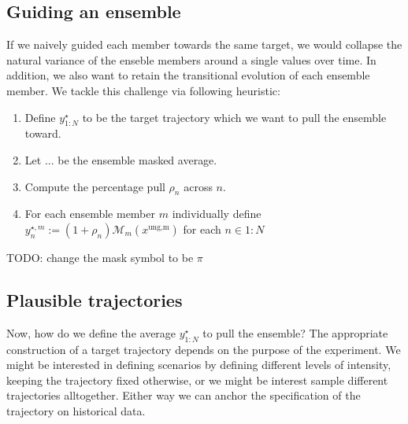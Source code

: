 \subsection{Guiding an ensemble}
If we naively guided each member towards the same target, we would collapse the natural variance of the enseble members around a single values over time.
In addition, we also want to retain the transitional evolution of each ensemble member. 
We tackle this challenge via following heuristic:
\begin{enumerate}[noitemsep]
    \item Define $y^\star_{1:N}$ to be the target trajectory which we want to pull the ensemble toward.
    \item Let $...$ be the ensemble masked average.
    \item Compute the percentage pull $\rho_n$ across $n$.
    \item For each ensemble member $m$ individually define $y^{\star, m}_{n}:= (1+\rho_n)\mathcal{M}_m(x^\text{ung,m})$ for each $n \in 1:N$ 
\end{enumerate}

TODO: change the mask symbol to be $\pi$ 

\subsection{Plausible trajectories}

Now, how do we define the average $y^\star_{1:N}$ to pull the ensemble?
The appropriate construction of a target trajectory depends on the purpose of the experiment.
We might be interested in defining scenarios by defining different levels of intensity, keeping the trajectory fixed otherwise, 
or we might be interest sample different trajectories alltogether.
Either way we can anchor the specification of the trajectory on historical data.

